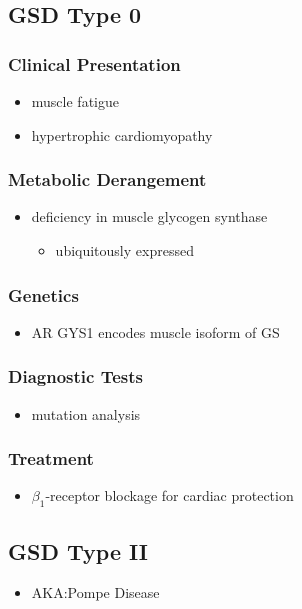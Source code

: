 \documentclass{scrartcl}
\begin{document}
\subsection{GSD Type 0}
\label{sec:orge5553fa}
\subsubsection{Clinical Presentation}
\label{sec:orgbd673ca}
\begin{itemize}
\item muscle fatigue
\item hypertrophic cardiomyopathy
\end{itemize}
\subsubsection{Metabolic Derangement}
\label{sec:org36bf415}
\begin{itemize}
\item deficiency in muscle glycogen synthase
\begin{itemize}
\item ubiquitously expressed
\end{itemize}
\end{itemize}
\subsubsection{Genetics}
\label{sec:orga91d99e}
\begin{itemize}
\item AR GYS1 encodes muscle isoform of GS
\end{itemize}
\subsubsection{Diagnostic Tests}
\label{sec:orgbd886e5}
\begin{itemize}
\item mutation analysis
\end{itemize}
\subsubsection{Treatment}
\label{sec:org226426c}
\begin{itemize}
\item \(\beta_{\text{1}}\)-receptor blockage for cardiac protection
\end{itemize}
\subsection{GSD Type II}
\label{sec:org74f5c98}
\begin{itemize}
\item AKA:Pompe Disease
\end{itemize}
\end{document}
